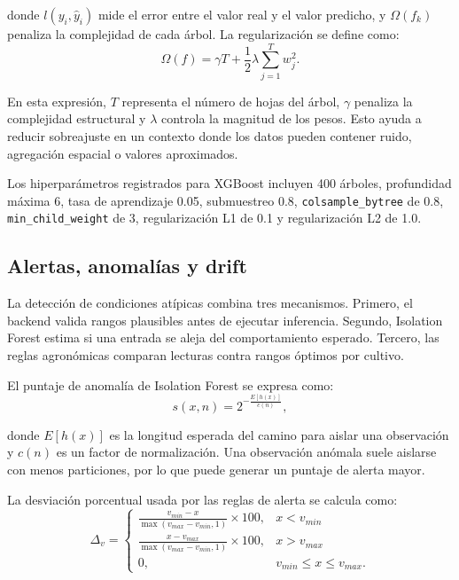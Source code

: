 \documentclass[conference,a4paper]{IEEEtran}
\begin{document}
donde $l(y_i,\hat{y}_i)$ mide el error entre el valor real y el valor predicho, y $\Omega(f_k)$ penaliza la complejidad de cada árbol. La regularización se define como:
\begin{equation}
\Omega(f)=\gamma T + \frac{1}{2}\lambda\sum_{j=1}^{T}w_j^2.
\end{equation}

En esta expresión, $T$ representa el número de hojas del árbol, $\gamma$ penaliza la complejidad estructural y $\lambda$ controla la magnitud de los pesos. Esto ayuda a reducir sobreajuste en un contexto donde los datos pueden contener ruido, agregación espacial o valores aproximados.

Los hiperparámetros registrados para XGBoost incluyen 400 árboles, profundidad máxima 6, tasa de aprendizaje 0.05, submuestreo 0.8, \texttt{colsample\_bytree} de 0.8, \texttt{min\_child\_weight} de 3, regularización L1 de 0.1 y regularización L2 de 1.0.

\subsection{Alertas, anomalías y drift}
La detección de condiciones atípicas combina tres mecanismos. Primero, el backend valida rangos plausibles antes de ejecutar inferencia. Segundo, Isolation Forest estima si una entrada se aleja del comportamiento esperado. Tercero, las reglas agronómicas comparan lecturas contra rangos óptimos por cultivo.

El puntaje de anomalía de Isolation Forest se expresa como:
\begin{equation}
s(x,n)=2^{-\frac{E[h(x)]}{c(n)}},
\end{equation}

donde $E[h(x)]$ es la longitud esperada del camino para aislar una observación y $c(n)$ es un factor de normalización. Una observación anómala suele aislarse con menos particiones, por lo que puede generar un puntaje de alerta mayor.

La desviación porcentual usada por las reglas de alerta se calcula como:
\begin{equation}
\Delta_v =
\begin{cases}
\frac{v_{min}-x}{\max(v_{max}-v_{min},1)}\times 100, & x<v_{min}\\
\frac{x-v_{max}}{\max(v_{max}-v_{min},1)}\times 100, & x>v_{max}\\
0, & v_{min}\leq x \leq v_{max}.
\end{cases}
\end{equation}
\end{document}
